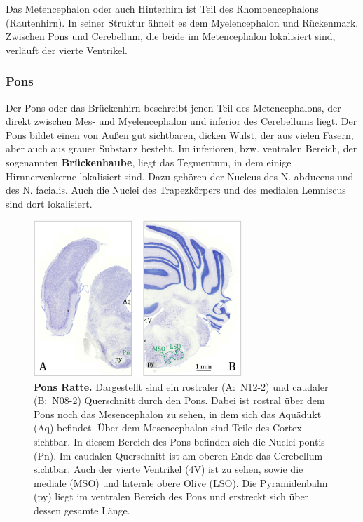 \documentclass[12pt,a4paper,pdftex]{article}
\begin{document}
Das Metencephalon oder auch Hinterhirn ist Teil des Rhombencephalons (Rautenhirn). In seiner Struktur ähnelt es dem Myelencephalon und Rückenmark. Zwischen Pons und Cerebellum, die beide im Metencephalon lokalisiert sind, verläuft der vierte Ventrikel.


\subsubsection{Pons}
\label{subsubsec:Pons} 

Der Pons oder das Brückenhirn beschreibt jenen Teil des Metencephalons, der direkt zwischen Mes- und Myelencephalon und inferior des Cerebellums liegt. Der Pons bildet einen von Außen gut sichtbaren, dicken Wulst, der aus vielen Fasern, aber auch aus grauer Substanz besteht. Im inferioren, bzw. ventralen Bereich, der sogenannten \textbf{Brückenhaube}, liegt das Tegmentum, in dem einige Hirnnervenkerne lokalisiert sind. Dazu gehören der Nucleus des N. abducens und des N. facialis. Auch die Nuclei des Trapezkörpers und des medialen Lemniscus sind dort lokalisiert.

\begin{figure}[H]
    \centering
    \includegraphics[width=0.7\textwidth]{pictures/Bilder_Jule/Ratte/pons.png}
    \caption[Pons Ratte]{\textbf{Pons Ratte.} Dargestellt sind ein rostraler (A:~N12-2) und caudaler (B:~N08-2) Querschnitt durch den Pons. Dabei ist rostral über dem Pons noch das Mesencephalon zu sehen, in dem sich das Aquädukt (Aq) befindet. Über dem Mesencephalon sind Teile des Cortex sichtbar. In diesem Bereich des Pons befinden sich die Nuclei pontis (Pn). Im caudalen Querschnitt ist am oberen Ende das Cerebellum sichtbar. Auch der vierte Ventrikel (4V) ist zu sehen, sowie die mediale (MSO) und laterale obere Olive (LSO). Die Pyramidenbahn (py) liegt im ventralen Bereich des Pons und erstreckt sich über dessen gesamte Länge.}
    \label{fig:pons_ratte}
\end{figure}{}
\end{document}
